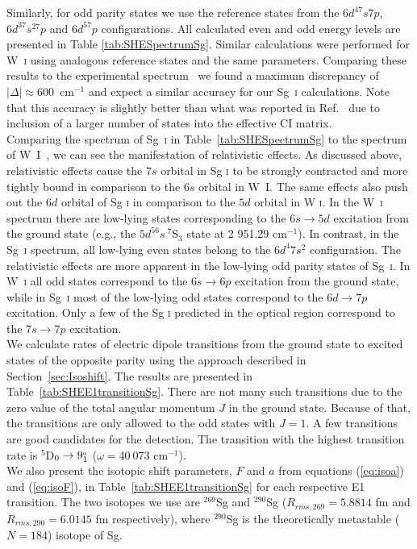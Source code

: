 \documentclass[10pt,a4paper, twoside, openright]{report}
\begin{document}
Similarly, for odd parity states we use the reference states from the $6d^47s7p$, $6d^37s^27p$ and $6d^57p$ configurations.  All calculated even and odd energy levels are presented in Table \ref{tab:SHESpectrumSg}. Similar calculations were performed for W~\textsc{i}  using analogous reference states and the same parameters. Comparing these results to the experimental spectrum~\cite{NIST_ASD} we found a maximum discrepancy of $|\Delta| \approx 600 $~cm$^{-1}$ and expect a similar accuracy for our Sg~\textsc{i} calculations. Note that this accuracy is slightly better than what was reported in Ref.~\cite{DBHF2017} due to inclusion of a larger number of states into the effective CI matrix.\\
\linebreak
Comparing the spectrum of Sg~\textsc{i} in Table~\ref{tab:SHESpectrumSg} to the spectrum of W~\textsc{I}~\cite{NIST_ASD}, we can see the manifestation of relativistic effects. As discussed above, relativistic effects cause the $7s$ orbital in Sg \textsc{i} to be strongly contracted and more tightly bound in comparison to the $6s$ orbital in W~\textsc{I}. The same effects also push out the $6d$ orbital of Sg \textsc{i} in comparison to the $5d$ orbital in W \textsc{i}. In the  W~\textsc{i} spectrum there are low-lying states corresponding to the $6s \rightarrow 5d$ excitation from the ground state (e.g., the $5d^56s \ ^7$S$_3$ state at 2 951.29 cm$^{-1}$). In contrast, in the Sg~\textsc{i} spectrum, all low-lying even states belong to the  $6d^4 7s^2$ configuration. The relativistic effects are more apparent in the low-lying odd parity states of Sg~\textsc{i}. In W~\textsc{i} all odd states correspond to the $6s \rightarrow 6p$ excitation from the ground state, while in Sg~\textsc{i} most of the low-lying odd states correspond to the $6d \rightarrow 7p$ excitation. Only a few of the Sg \textsc{i} predicted in the optical region correspond to the $7s \rightarrow 7p$ excitation.  \\
\linebreak
We calculate rates of electric dipole transitions from the ground state to excited states of the opposite parity using the approach described in Section~\ref{sec:Isoshift}. The results are presented in Table~\ref{tab:SHEE1transitionSg}. There are not many such transitions due to the zero value of the total angular momentum $J$ in the ground state. Because of that, the transitions are only allowed to the odd states with $J=1$. A few transitions are good candidates for the detection. The transition with the highest transition rate is $^5$D$_0 \rightarrow 9_1^{\rm_o}$ ($\omega = 40 \ 073 \text{ cm}^{-1}$).\\
\linebreak
We also present the isotopic shift parameters, $F$ and $a$ from equations (\ref{eq:isoa}) and (\ref{eq:isoF}), in Table~\ref{tab:SHEE1transitionSg} for each respective E1 transition. The two isotopes we use are $^{269}$Sg  and $^{290}$Sg ($R_{rms,\text{269}} = 5.8814$ fm and $R_{rms,\text{290}}  = 6.0145$ fm respectively),  where $^{290}$Sg is the theoretically  metastable ($N=184$) isotope of Sg. 
\end{document}
